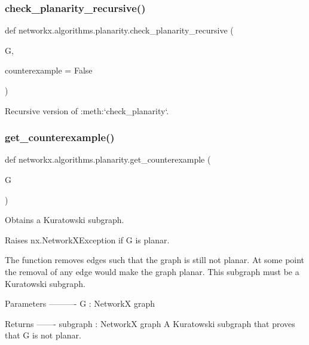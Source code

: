 \subsubsection{\texorpdfstring{check\+\_\+planarity\+\_\+recursive()}{check\_planarity\_recursive()}}
{\footnotesize\ttfamily def networkx.\+algorithms.\+planarity.\+check\+\_\+planarity\+\_\+recursive (\begin{DoxyParamCaption}\item[{}]{G,  }\item[{}]{counterexample = {\ttfamily False} }\end{DoxyParamCaption})}

\begin{DoxyVerb}Recursive version of :meth:`check_planarity`.\end{DoxyVerb}
 \mbox{\label{namespacenetworkx_1_1algorithms_1_1planarity_a97ea2c6e41104ab6c6ec657ca362a0cf}} 
\subsubsection{\texorpdfstring{get\+\_\+counterexample()}{get\_counterexample()}}
{\footnotesize\ttfamily def networkx.\+algorithms.\+planarity.\+get\+\_\+counterexample (\begin{DoxyParamCaption}\item[{}]{G }\end{DoxyParamCaption})}

\begin{DoxyVerb}Obtains a Kuratowski subgraph.

Raises nx.NetworkXException if G is planar.

The function removes edges such that the graph is still not planar.
At some point the removal of any edge would make the graph planar.
This subgraph must be a Kuratowski subgraph.

Parameters
----------
G : NetworkX graph

Returns
-------
subgraph : NetworkX graph
    A Kuratowski subgraph that proves that G is not planar.\end{DoxyVerb}
 \mbox{\label{namespacenetworkx_1_1algorithms_1_1planarity_a229d1aa5c79f2e3fd5cecb59f947d955}} 
